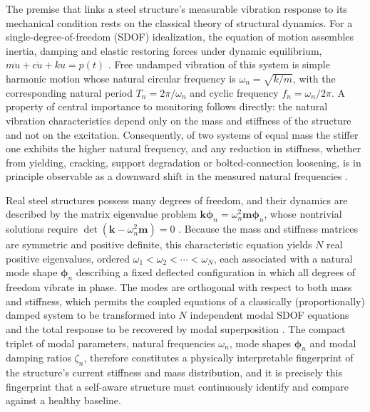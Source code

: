 The premise that links a steel structure's measurable vibration response to its mechanical condition rests on the classical theory of structural dynamics. For a single-degree-of-freedom (SDOF) idealization, the equation of motion assembles inertia, damping and elastic restoring forces under dynamic equilibrium, $m\ddot{u} + c\dot{u} + ku = p(t)$ \citep{chopra2017dynamics}. Free undamped vibration of this system is simple harmonic motion whose natural circular frequency is $\omega_n = \sqrt{k/m}$, with the corresponding natural period $T_n = 2\pi/\omega_n$ and cyclic frequency $f_n = \omega_n/2\pi$. A property of central importance to monitoring follows directly: the natural vibration characteristics depend only on the mass and stiffness of the structure and not on the excitation. Consequently, of two systems of equal mass the stiffer one exhibits the higher natural frequency, and any reduction in stiffness, whether from yielding, cracking, support degradation or bolted-connection loosening, is in principle observable as a downward shift in the measured natural frequencies \citep{chopra2017dynamics,avci2021review}.

Real steel structures possess many degrees of freedom, and their dynamics are described by the matrix eigenvalue problem $\mathbf{k}\boldsymbol{\phi}_n = \omega_n^2 \mathbf{m}\boldsymbol{\phi}_n$, whose nontrivial solutions require $\det(\mathbf{k} - \omega_n^2\mathbf{m}) = 0$ \citep{chopra2017dynamics}. Because the mass and stiffness matrices are symmetric and positive definite, this characteristic equation yields $N$ real positive eigenvalues, ordered $\omega_1 < \omega_2 < \cdots < \omega_N$, each associated with a natural mode shape $\boldsymbol{\phi}_n$ describing a fixed deflected configuration in which all degrees of freedom vibrate in phase. The modes are orthogonal with respect to both mass and stiffness, which permits the coupled equations of a classically (proportionally) damped system to be transformed into $N$ independent modal SDOF equations and the total response to be recovered by modal superposition \citep{chopra2017dynamics}. The compact triplet of modal parameters, natural frequencies $\omega_n$, mode shapes $\boldsymbol{\phi}_n$ and modal damping ratios $\zeta_n$, therefore constitutes a physically interpretable fingerprint of the structure's current stiffness and mass distribution, and it is precisely this fingerprint that a self-aware structure must continuously identify and compare against a healthy baseline.

